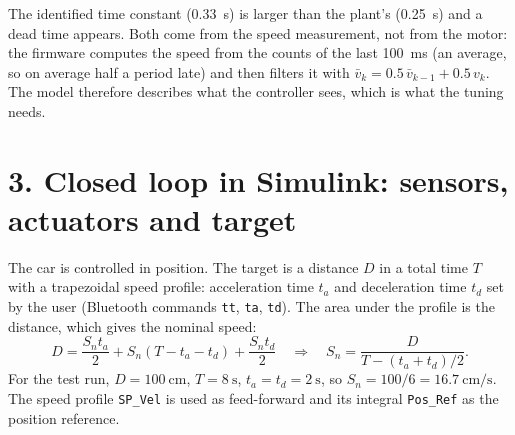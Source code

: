 \documentclass[letterpaper, 11pt]{article}
\begin{document}
The identified time constant (\SI{0.33}{\second}) is larger than the plant's
(\SI{0.25}{\second}) and a dead time appears. Both come from the speed measurement,
not from the motor: the firmware computes the speed from the counts of the last
\SI{100}{\milli\second} (an average, so on average half a period late) and then
filters it with $\bar v_k = 0.5\,\bar v_{k-1} + 0.5\,v_k$. The model therefore
describes what the controller sees, which is what the tuning needs.


\section*{3. Closed loop in Simulink: sensors, actuators and target}

The car is controlled in position. The target is a distance $D$ in a total time $T$
with a trapezoidal speed profile: acceleration time $t_a$ and deceleration time $t_d$
set by the user (Bluetooth commands \texttt{tt}, \texttt{ta}, \texttt{td}). The
area under the profile is the distance, which gives the nominal speed:
\[
  D = \frac{S_n t_a}{2} + S_n (T - t_a - t_d) + \frac{S_n t_d}{2}
  \quad\Rightarrow\quad
  S_n = \frac{D}{T - (t_a + t_d)/2}.
\]
For the test run, $D = \SI{100}{\centi\meter}$, $T = \SI{8}{\second}$,
$t_a = t_d = \SI{2}{\second}$, so $S_n = 100/6 = \SI{16.7}{\centi\meter\per\second}$.
The speed profile \texttt{SP\_Vel} is used as feed-forward and its integral
\texttt{Pos\_Ref} as the position reference.
\end{document}
